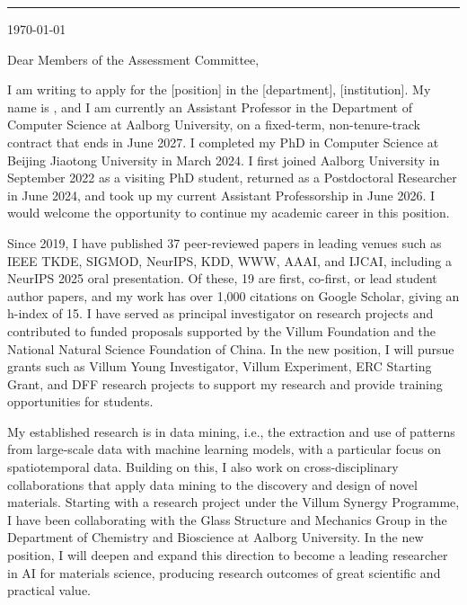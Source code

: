 \documentclass[a4paper]{article}
\begin{document}


{\color{rule}\rule{\linewidth}{0.4pt}}

\vspace{\entryskip}
\today

\vspace{\entryskip}
Dear Members of the Assessment Committee,

\vspace{\entryskip}
I am writing to apply for the [position] in the [department], [institution].
My name is \myname, and I am currently an Assistant Professor in the Department of Computer Science at Aalborg University, on a fixed-term, non-tenure-track contract that ends in June 2027.
I completed my PhD in Computer Science at Beijing Jiaotong University in March 2024.
I first joined Aalborg University in September 2022 as a visiting PhD student, returned as a Postdoctoral Researcher in June 2024, and took up my current Assistant Professorship in June 2026.
I would welcome the opportunity to continue my academic career in this position.

\vspace{\entryskip}
Since 2019, I have published 37 peer-reviewed papers in leading venues such as IEEE TKDE, SIGMOD, NeurIPS, KDD, WWW, AAAI, and IJCAI, including a NeurIPS 2025 oral presentation.
Of these, 19 are first, co-first, or lead student author papers, and my work has over 1{,}000 citations on Google Scholar, giving an h-index of 15.
I have served as principal investigator on research projects and contributed to funded proposals supported by the Villum Foundation and the National Natural Science Foundation of China.
In the new position, I will pursue grants such as Villum Young Investigator, Villum Experiment, ERC Starting Grant, and DFF research projects to support my research and provide training opportunities for students.

\vspace{\entryskip}
My established research is in data mining, i.e., the extraction and use of patterns from large-scale data with machine learning models, with a particular focus on spatiotemporal data.
Building on this, I also work on cross-disciplinary collaborations that apply data mining to the discovery and design of novel materials.
Starting with a research project under the Villum Synergy Programme, I have been collaborating with the Glass Structure and Mechanics Group in the Department of Chemistry and Bioscience at Aalborg University.
In the new position, I will deepen and expand this direction to become a leading researcher in AI for materials science, producing research outcomes of great scientific and practical value.
\end{document}
